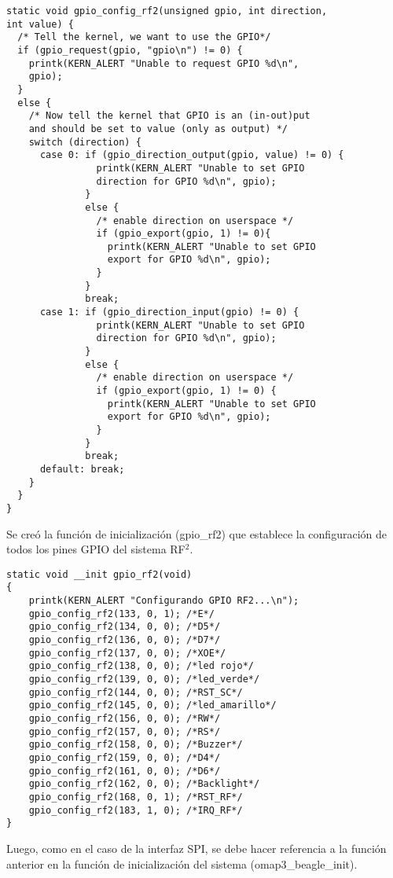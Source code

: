 \begin{verbatim}
static void gpio_config_rf2(unsigned gpio, int direction, 
int value) {
  /* Tell the kernel, we want to use the GPIO*/
  if (gpio_request(gpio, "gpio\n") != 0) {
    printk(KERN_ALERT "Unable to request GPIO %d\n", 
    gpio);
  }
  else {
    /* Now tell the kernel that GPIO is an (in-out)put 
    and should be set to value (only as output) */
    switch (direction) {
      case 0: if (gpio_direction_output(gpio, value) != 0) {
                printk(KERN_ALERT "Unable to set GPIO 
                direction for GPIO %d\n", gpio);
              }
              else {
                /* enable direction on userspace */
                if (gpio_export(gpio, 1) != 0){ 
                  printk(KERN_ALERT "Unable to set GPIO 
                  export for GPIO %d\n", gpio);
                }
              }
              break;
      case 1: if (gpio_direction_input(gpio) != 0) {
                printk(KERN_ALERT "Unable to set GPIO 
                direction for GPIO %d\n", gpio);
              }
              else {
                /* enable direction on userspace */
                if (gpio_export(gpio, 1) != 0) { 
                  printk(KERN_ALERT "Unable to set GPIO 
                  export for GPIO %d\n", gpio);
                }
              }
              break;
      default: break;
    }
  }	
}
\end{verbatim}

Se creó la función de inicialización (gpio\_rf2) que establece la configuración de todos los pines GPIO del sistema RF$^{2}$.

\begin{verbatim}
static void __init gpio_rf2(void)
{
    printk(KERN_ALERT "Configurando GPIO RF2...\n");
    gpio_config_rf2(133, 0, 1); /*E*/
    gpio_config_rf2(134, 0, 0); /*D5*/
    gpio_config_rf2(136, 0, 0); /*D7*/
    gpio_config_rf2(137, 0, 0); /*XOE*/
    gpio_config_rf2(138, 0, 0); /*led rojo*/
    gpio_config_rf2(139, 0, 0); /*led_verde*/
    gpio_config_rf2(144, 0, 0); /*RST_SC*/
    gpio_config_rf2(145, 0, 0); /*led_amarillo*/
    gpio_config_rf2(156, 0, 0); /*RW*/
    gpio_config_rf2(157, 0, 0); /*RS*/
    gpio_config_rf2(158, 0, 0); /*Buzzer*/
    gpio_config_rf2(159, 0, 0); /*D4*/
    gpio_config_rf2(161, 0, 0); /*D6*/
    gpio_config_rf2(162, 0, 0); /*Backlight*/
    gpio_config_rf2(168, 0, 1); /*RST_RF*/
    gpio_config_rf2(183, 1, 0); /*IRQ_RF*/
}
\end{verbatim}

Luego, como en el caso de la interfaz SPI, se debe hacer referencia a la función anterior en la función de inicialización del sistema (omap3\_beagle\_init).

